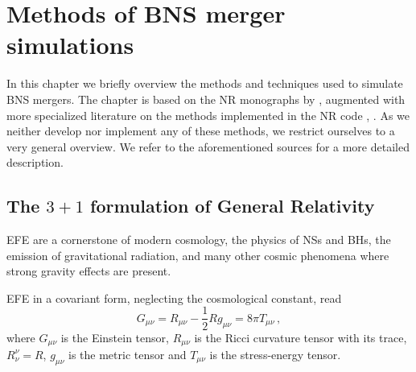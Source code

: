 \chapter{Methods of BNS merger simulations}\label{ch:nr_methods}

In this chapter we briefly overview the methods and 
techniques used to simulate \ac{BNS} mergers. 
%
The chapter is based on the \ac{NR} monographs by 
\citet{Alcubierre:2008,Baumgarte:2010,Rezzolla:2013}, 
augmented with more specialized literature on the 
methods implemented in the \ac{NR} code \wisky{}, 
\citep{Radice:2012cu,Radice:2016dwd,Radice:2017zta,Radice:2018pdn,Radice:2020ids}.
%
As we neither develop nor implement any of these methods, 
we restrict ourselves to a very general overview.
We refer to the aforementioned sources for a more detailed description.
%



\section{The $3+1$ formulation of General Relativity}\label{sec:nr_methods:nr}


\ac{EFE} are a cornerstone of modern cosmology, the physics of 
\acp{NS} and \acp{BH}, the emission of gravitational radiation, 
and many other cosmic phenomena where strong gravity effects are present. 

\ac{EFE} in a covariant form, neglecting the cosmological constant, read
%
\begin{equation}
G_{\mu\nu} = R_{\mu\nu} - \frac{1}{2} R g_{\mu\nu} = 8\pi T_{\mu\nu}\, ,
\label{eq:theory:EFE}
\end{equation}
%
%
where $G_{\mu\nu}$ is the Einstein tensor, 
$R_{\mu\nu}$ is the Ricci curvature tensor with its trace, 
$R^{\nu}_{\nu} = R$, $g_{\mu\nu}$ is the metric tensor and 
$T_{\mu\nu}$ is the stress-energy tensor.

